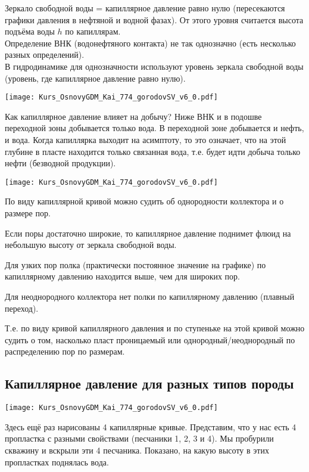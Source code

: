 \documentclass[main.tex]{subfiles}
\begin{document}
Зеркало свободной воды = капиллярное давление равно нулю (пересекаются графики давления в нефтяной и водной фазах).
От этого уровня считается высота подъёма воды $h$ по капиллярам.
\\

Определение ВНК (водонефтяного контакта) не так однозначно (есть несколько разных определений).
\\

В гидродинамике для однозначности используют уровень зеркала свободной воды (уровень, где капиллярное давление равно нулю).

\texttt{[image: Kurs\_OsnovyGDM\_Kai\_774\_gorodovSV\_v6\_0.pdf]}

Как капиллярное давление влияет на добычу?
Ниже ВНК и в подошве переходной зоны добывается только вода.
В переходной зоне добывается и нефть, и вода.
Когда капиллярка выходит на асимптоту, то это означает, что на этой глубине в пласте находится только связанная вода, т.е. будет идти добыча только нефти (безводной продукции).

\texttt{[image: Kurs\_OsnovyGDM\_Kai\_774\_gorodovSV\_v6\_0.pdf]}

По виду капиллярной кривой можно судить об однородности коллектора и о размере пор.

Если поры достаточно широкие, то капиллярное давление поднимет флюид на небольшую высоту от зеркала свободной воды.

Для узких пор полка (практически постоянное значение на графике) по капиллярному давлению находится выше, чем для широких пор.

Для неоднородного коллектора нет полки по капиллярному давлению (плавный переход).

Т.е. по виду кривой капиллярного давления и по ступеньке на этой кривой можно судить о том, насколько пласт проницаемый или однородный/неоднородный по распределению пор по размерам.

\subsection{Капиллярное давление для разных типов породы}

\texttt{[image: Kurs\_OsnovyGDM\_Kai\_774\_gorodovSV\_v6\_0.pdf]}

Здесь ещё раз нарисованы 4 капиллярные кривые.
Представим, что у нас есть 4 пропластка с разными свойствами (песчаники 1, 2, 3 и 4).
Мы пробурили скважину и вскрыли эти 4 песчаника.
Показано, на какую высоту в этих пропластках поднялась вода. 
\end{document}
